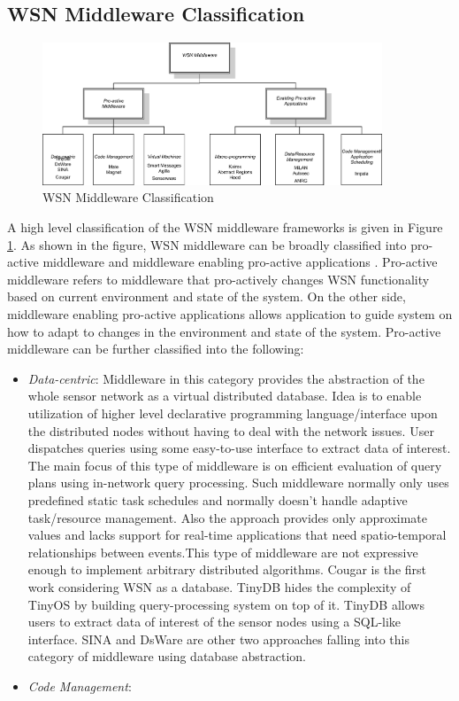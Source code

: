 \subsection{WSN Middleware Classification}
\begin{figure}[tbp]
\centerline{\includegraphics[width=4in]{figures/middleware-classification.eps}}
\caption{WSN Middleware Classification}
\label{fig:middleware-classification}
\end{figure}
A high level classification of the WSN 
middleware frameworks is given in Figure
\ref{fig:middleware-classification}. As
shown in the figure, WSN middleware can be
broadly classified into pro-active middleware
and middleware enabling pro-active applications
\cite{Heinzelman04}. Pro-active middleware refers
to middleware that pro-actively changes WSN
functionality based on current environment and
state of the system. On the other side,
middleware enabling pro-active applications
allows application to guide system on how to
adapt to changes in the environment and state of
the system. 
Pro-active middleware can be further classified
into the following:
\begin{itemize}
  \item \emph{Data-centric}: Middleware in this
  category provides the abstraction of the   whole
  sensor network as a virtual   distributed
  database. Idea is to enable   utilization of
  higher level declarative   programming
  language/interface upon the   distributed nodes
  without having to deal with the network issues.
  User dispatches queries using some easy-to-use
  interface to extract data of interest. The main
  focus of this type of middleware is on efficient
  evaluation of query plans using in-network query
  processing. Such middleware normally only uses
  predefined static task schedules and normally
  doesn't handle adaptive task/resource management.
  Also the approach provides only approximate
  values and lacks support for real-time
  applications that need spatio-temporal
  relationships between events\cite{Hadem06}.This
  type of middleware are not expressive enough
  to implement arbitrary distributed algorithms.
  Cougar \cite{Yao02} is the first work considering WSN as a database. TinyDB \cite{Madden02} hides the complexity of TinyOS by building
  query-processing system on top of it. TinyDB
  allows users to extract data of interest of the
  sensor nodes using a SQL-like interface.
  SINA\cite{Srisathapornphat01} and
  DsWare\cite{Son03} are other two approaches
  falling into this category of middleware using
  database abstraction.
  \item  \emph{Code Management}:
\end{itemize}
